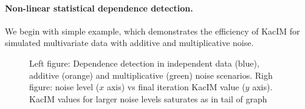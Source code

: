 \documentclass{article}
\begin{document}
\paragraph{Non-linear statistical dependence detection.} We begin with simple example, which demonstrates the efficiency of KacIM for simulated multivariate data with additive and multiplicative noise.


\begin{figure}%
	\centering
	\qquad
	\caption{Left figure: Dependence detection in independent data (blue), additive (orange) and multiplicative (green) noise scenarios. Righ figure: noise level ($x$ axis) vs final iteration KacIM value ($y$ axis). KacIM values for larger noise levels saturates as in tail of graph}
	\label{fig:experiments_simulation}
\end{figure}
\end{document}
